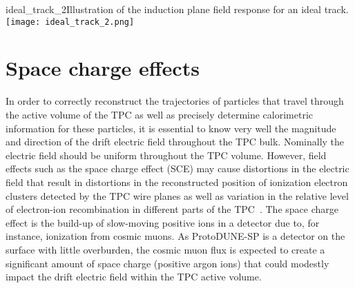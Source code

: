\begin{cdrfigure}{ideal_track_2}{Illustration of the induction plane field response for an ideal track.}
\texttt{[image: ideal\_track\_2.png]}
\end{cdrfigure}








\section{Space charge effects}

\label{sec:SCEintro}

In order to correctly reconstruct the trajectories of particles that travel through the active volume of the TPC as well as precisely determine calorimetric information for these particles, it is essential to know very well the magnitude and direction of the drift electric field throughout the TPC bulk.  Nominally the electric field should be uniform throughout the TPC volume.  However, field effects such as the space charge effect (SCE) may cause distortions in the electric field that result in distortions in the reconstructed position of ionization electron clusters detected by the TPC wire planes as well as variation in the relative level of electron-ion recombination in different parts of the TPC~\cite{KirkSCE}.  The space charge effect is the build-up of slow-moving positive ions in a detector due to, for instance, ionization from cosmic muons.  As ProtoDUNE-SP is a detector on the surface with little overburden, the cosmic muon flux is expected to create a significant amount of space charge (positive argon ions) that could modestly impact the drift electric field within the TPC active volume.

